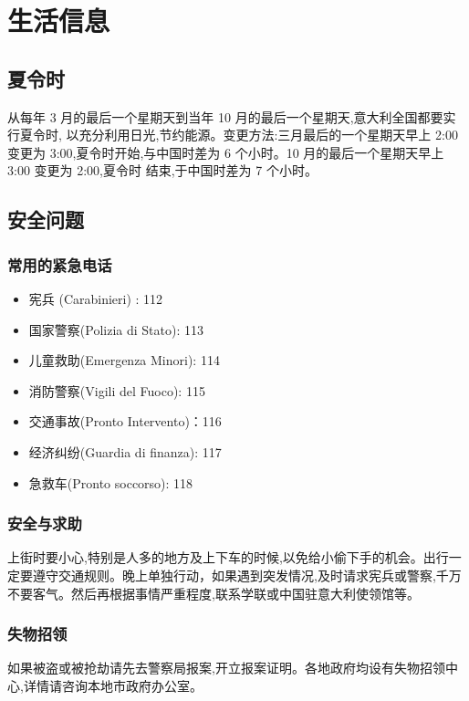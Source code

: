 \chapter{生活信息}              

\section{夏令时} 

从每年 3 月的最后一个星期天到当年 10 月的最后一个星期天,意大利全国都要实行夏令时, 以充分利用日光,节约能源。变更方法:三月最后的一个星期天早上 2:00 变更为 3:00,夏令时开始,与中国时差为 6 个小时。10 月的最后一个星期天早上 3:00 变更为 2:00,夏令时 结束,于中国时差为 7 个小时。

\section{安全问题}

\subsection{常用的紧急电话}

\begin{itemize}
\item 宪兵 (Carabinieri) : 112 
\item 国家警察(Polizia di Stato): 113 
\item 儿童救助(Emergenza Minori): 114
\item 消防警察(Vigili del Fuoco): 115 
\item 交通事故(Pronto Intervento)：116 
\item 经济纠纷(Guardia di finanza): 117
\item 急救车(Pronto soccorso): 118
\end{itemize}

\subsection{安全与求助}
上街时要小心,特别是人多的地方及上下车的时候,以免给小偷下手的机会。出行一定要遵守交通规则。晚上单独行动，如果遇到突发情况,及时请求宪兵或警察,千万不要客气。然后再根据事情严重程度,联系学联或中国驻意大利使领馆等。

\subsection{失物招领}
如果被盗或被抢劫请先去警察局报案,开立报案证明。各地政府均设有失物招领中心,详情请咨询本地市政府办公室。

